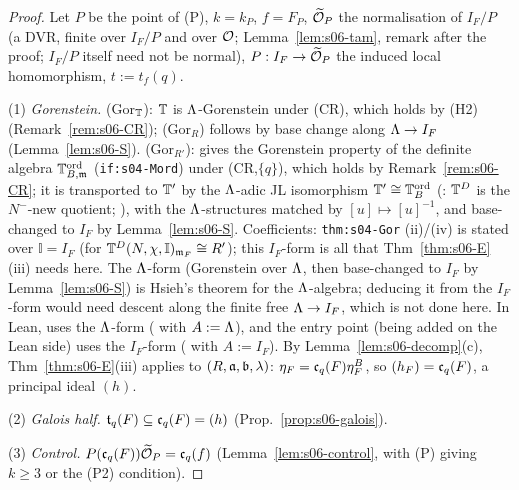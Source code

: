 \begin{proof}
Let $P$ be the point of (P), $k=k_P$, $f=F_P$, $\widetilde{\mathcal{O}}_P$ the normalisation of $I_F/P$ (a DVR, finite over $I_F/P$ and over $\mathcal{O}$; Lemma~\ref{lem:s06-tam}, remark after the proof; $I_F/P$ itself need not be normal), $P:I_F\to\widetilde{\mathcal{O}}_P$ the induced local homomorphism, $t:=t_f(q)$.

(1) \emph{Gorenstein.} (Gor$_{\mathbb{T}}$): $\mathbb{T}$ is $\Lambda$-Gorenstein \cite[\S3.3, p.~17--18]{Hs}
 \stcited{} under
(CR), which holds by (H2) (Remark~\ref{rem:s06-CR}); (Gor$_R$) follows by base change along $\Lambda\to I_F$ (Lemma~\ref{lem:s06-S}).
(Gor$_{R'}$): \cite[Thm~4.5 and proof, p.~34]{Hs}  \stcited{} gives the Gorenstein property of the definite algebra $\mathbb{T}^{\mathrm{ord}}_{B,\mathfrak{m}}$ (\texttt{if:s04-Mord})
under (CR,$\{q\}$), which holds by Remark~\ref{rem:s06-CR}; it is transported to $\mathbb{T}'$ by the $\Lambda$-adic JL isomorphism
$\mathbb{T}'\cong\mathbb{T}^{\mathrm{ord}}_B$ (\cite[Rem.~7.8]{Hs}: $\mathbb{T}^D$ is the $N^-$-new quotient; ), with the $\Lambda$-structures matched by
$[u]\mapsto[u]^{-1}$, and base-changed to $I_F$ by Lemma~\ref{lem:s06-S}. Coefficients: \texttt{thm:s04-Gor} (ii)/(iv) is stated over $\mathbb I=I_F$ (for $\mathbb{T}^D(N,\chi,\mathbb I)_{\mathfrak{m}_F}\cong R'$); this $I_F$-form is all that Thm~\ref{thm:s06-E}(iii) needs here. The $\Lambda$-form (Gorenstein over $\Lambda$, then base-changed to $I_F$ by Lemma~\ref{lem:s06-S}) is Hsieh's theorem for the $\Lambda$-algebra; deducing it from the $I_F$-form would need descent along the finite free $\Lambda\to I_F$, which is not done here. In Lean,  uses the $\Lambda$-form ( with $A:=\Lambda$), and the entry point  (being added on the Lean side) uses the $I_F$-form ( with $A:=I_F$). By Lemma~\ref{lem:s06-decomp}(c), Thm~\ref{thm:s06-E}(iii)
applies to $(R,\mathfrak{a},\mathfrak{b},\lambda)$: $\eta_F=\mathfrak{c}_q(F)\eta^B_F$, so $(h_F)=\mathfrak{c}_q(F)$, a principal ideal $(h)$.

(2) \emph{Galois half.} $\mathfrak{t}_q(F)\subseteq\mathfrak{c}_q(F)=(h)$ (Prop.~\ref{prop:s06-galois}).

(3) \emph{Control.} $P(\mathfrak{c}_q(F))\widetilde{\mathcal{O}}_P=\mathfrak{c}_q(f)$ (Lemma~\ref{lem:s06-control}, with (P) giving $k\ge3$ or the (P2) condition).


\end{proof}
